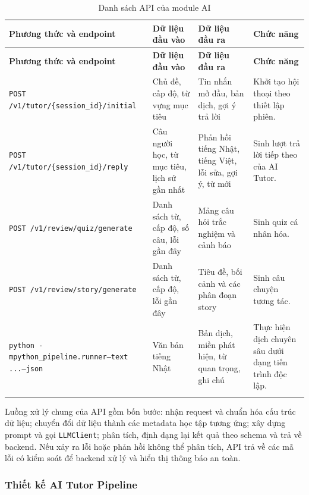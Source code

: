 \documentclass[../DoAn.tex]{subfiles}
\begin{document}
\begin{longtable}{|p{4.2cm}|p{3.0cm}|p{3.0cm}|p{3.2cm}|}
\hline
\textbf{Phương thức và endpoint} & \textbf{Dữ liệu đầu vào} & \textbf{Dữ liệu đầu ra} & \textbf{Chức năng} \\
\hline
\endfirsthead
\hline
\textbf{Phương thức và endpoint} & \textbf{Dữ liệu đầu vào} & \textbf{Dữ liệu đầu ra} & \textbf{Chức năng} \\
\hline
\endhead
\texttt{POST /v1/\allowbreak tutor/\allowbreak \{session\_\allowbreak id\}/\allowbreak initial} & Chủ đề, cấp độ, từ vựng mục tiêu & Tin nhắn mở đầu, bản dịch, gợi ý trả lời & Khởi tạo hội thoại theo thiết lập phiên. \\
\hline
\texttt{POST /v1/\allowbreak tutor/\allowbreak \{session\_\allowbreak id\}/\allowbreak reply} & Câu người học, từ mục tiêu, lịch sử gần nhất & Phản hồi tiếng Nhật, tiếng Việt, lỗi sửa, gợi ý, từ mới & Sinh lượt trả lời tiếp theo của AI Tutor. \\
\hline
\texttt{POST /v1/\allowbreak review/\allowbreak quiz/\allowbreak generate} & Danh sách từ, cấp độ, số câu, lỗi gần đây & Mảng câu hỏi trắc nghiệm và cảnh báo & Sinh quiz cá nhân hóa. \\
\hline
\texttt{POST /v1/\allowbreak review/\allowbreak story/\allowbreak generate} & Danh sách từ, cấp độ, lỗi gần đây & Tiêu đề, bối cảnh và các phân đoạn story & Sinh câu chuyện tương tác. \\
\hline
\texttt{python -m\allowbreak python\_pipeline.\allowbreak runner\allowbreak --text ...\allowbreak --json} & Văn bản tiếng Nhật & Bản dịch, miền phát hiện, từ quan trọng, ghi chú & Thực hiện dịch chuyên sâu dưới dạng tiến trình độc lập. \\
\hline
\caption{Danh sách API của module AI}
\label{table:4.7}\\
\end{longtable}

Luồng xử lý chung của API gồm bốn bước: nhận request và chuẩn hóa cấu trúc dữ liệu; chuyển đổi dữ liệu thành các metadata học tập tương ứng; xây dựng prompt và gọi \texttt{LLMClient}; phân tích, định dạng lại kết quả theo schema và trả về backend. Nếu xảy ra lỗi hoặc phản hồi không thể phân tích, API trả về các mã lỗi có kiểm soát để backend xử lý và hiển thị thông báo an toàn.

\subsubsection{Thiết kế AI Tutor Pipeline}
\end{document}
